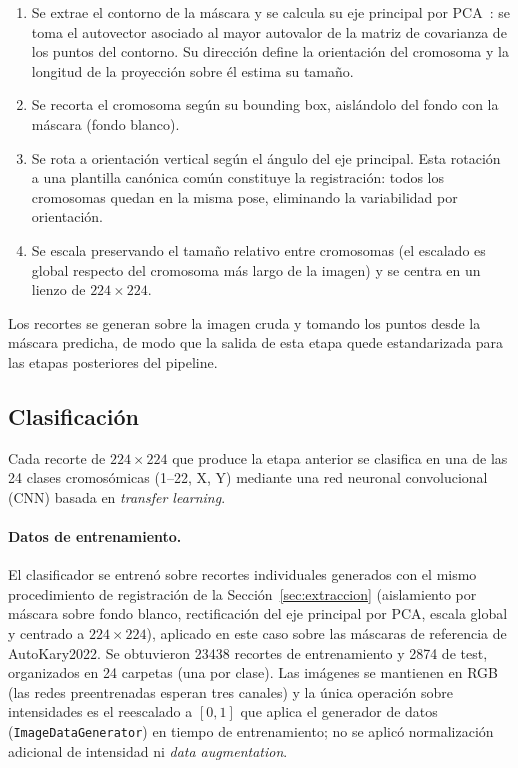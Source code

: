 \documentclass[11pt,a4paper]{article}
\begin{document}
\begin{enumerate}[topsep=2pt,itemsep=1pt]
  \item Se extrae el contorno de la máscara y se calcula su eje principal
        por PCA~\cite{jolliffe2016pca}: se toma el autovector asociado al mayor
        autovalor de la matriz de covarianza de los puntos del contorno. Su
        dirección define la orientación del cromosoma y la longitud de la
        proyección sobre él estima su tamaño.
  \item Se recorta el cromosoma según su bounding box, aislándolo del fondo
        con la máscara (fondo blanco).
  \item Se rota a orientación vertical según el ángulo del eje principal.
        Esta rotación a una plantilla canónica común constituye la
        registración: todos los cromosomas quedan en la misma pose,
        eliminando la variabilidad por orientación.
  \item Se escala preservando el tamaño relativo entre cromosomas (el
        escalado es global respecto del cromosoma más largo de la imagen) y se
        centra en un lienzo de \(224\times224\).
\end{enumerate}

Los recortes se generan sobre la imagen cruda y tomando los puntos desde la máscara
predicha, de modo que la salida de esta etapa quede estandarizada para las etapas
posteriores del pipeline.

\subsection{Clasificación}
\label{sec:clasificacion}

Cada recorte de \(224\times224\) que produce la etapa anterior se clasifica en una
de las 24 clases cromosómicas (1--22, X, Y) mediante una red neuronal convolucional
(CNN) basada en \textit{transfer learning}.

\paragraph{Datos de entrenamiento.} El clasificador se entrenó sobre recortes
individuales generados con el mismo procedimiento de registración de la
Sección~\ref{sec:extraccion} (aislamiento por máscara sobre fondo blanco,
rectificación del eje principal por PCA, escala global y centrado a
\(224\times224\)), aplicado en este caso sobre las máscaras de referencia de
AutoKary2022. Se obtuvieron \num{23438} recortes de entrenamiento y \num{2874} de
test, organizados en 24 carpetas (una por clase). Las imágenes se mantienen en RGB
(las redes preentrenadas esperan tres canales) y la única operación sobre
intensidades es el reescalado a \([0,1]\) que aplica el generador de datos
(\texttt{ImageDataGenerator}) en tiempo de entrenamiento; no se aplicó normalización
adicional de intensidad ni \textit{data augmentation}.
\end{document}
